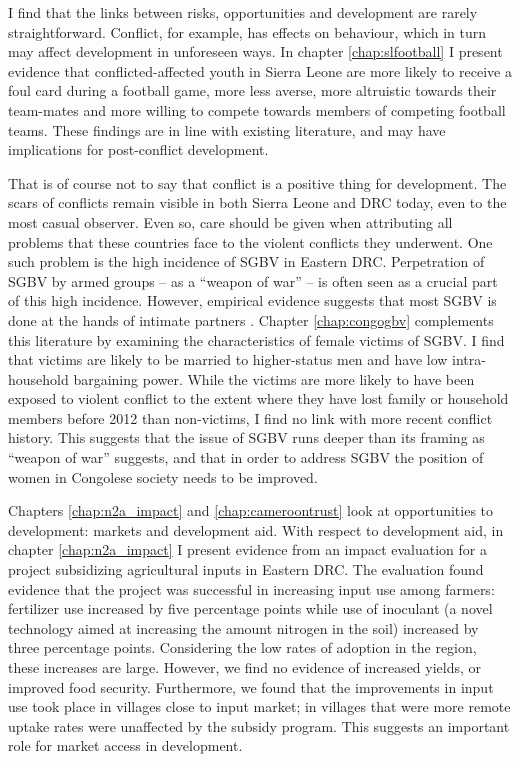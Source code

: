 I find that the links between risks, opportunities and development are rarely straightforward. Conflict, for example, has effects on behaviour, which in turn may affect development in unforeseen ways. In chapter \ref{chap:slfootball} I present evidence that conflicted-affected youth in Sierra Leone are more likely to receive a foul card during a football game, more less averse,  more altruistic towards their team-mates and more willing to compete towards members of competing football teams. These findings are in line with existing literature, and may have implications for post-conflict development. 

That is of course not to say that conflict is a positive thing for development. The scars of conflicts remain visible in both Sierra Leone and DRC today, even to the most casual observer. Even so, care should be given when attributing all problems that these countries face to the violent conflicts they underwent. One such problem is the high incidence of SGBV in Eastern DRC. Perpetration of SGBV by armed groups -- as a ``weapon of war'' -- is often seen as a crucial part of this high incidence. However, empirical evidence suggests that most SGBV is done at the hands of intimate partners \citep[see e.g.][]{Peterman2011}. Chapter \ref{chap:congogbv} complements this literature by examining the characteristics of female victims of SGBV. I find that victims are likely to be married to higher-status men and have low intra-household bargaining power. While the victims are more likely to have been exposed to violent conflict to the extent where they have lost family or household members before 2012 than non-victims, I find no link with more recent conflict history. This suggests that the issue of SGBV runs deeper than its framing as ``weapon of war'' suggests, and that  in order to address SGBV the position of women in Congolese society needs to be improved.

Chapters \ref{chap:n2a_impact} and \ref{chap:cameroontrust} look at opportunities to development: markets and development aid. With respect to development aid, in chapter \ref{chap:n2a_impact} I present evidence from an impact evaluation for a project subsidizing agricultural inputs in Eastern DRC. The evaluation found evidence that the project was successful in increasing input use among farmers: fertilizer use increased by five percentage points while use of inoculant (a novel technology aimed at increasing the amount nitrogen in the soil) increased by three percentage points. Considering the low rates of adoption in the region, these increases are large. However, we find no evidence of increased yields, or improved food security. Furthermore, we found that the improvements in input use took place in villages close to input market; in villages that were more remote uptake rates were unaffected by the subsidy program. This suggests an important role for market access in development.

